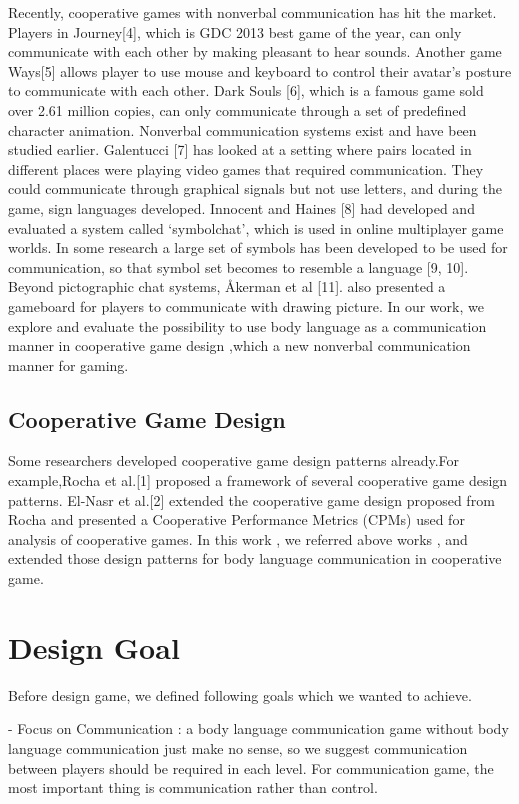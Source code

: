 \documentclass{sigchi}
\begin{document}
Recently, cooperative games with nonverbal communication has hit the market. Players in Journey[4], which is GDC 2013 best game of the year, can only communicate with each other by making pleasant to hear sounds. Another game Ways[5] allows player to use mouse and keyboard to control their avatar’s posture to communicate with each other. Dark Souls [6], which is a famous game sold over 2.61 million copies, can only communicate through a set of predefined character animation.
Nonverbal communication systems exist and have been studied earlier. Galentucci [7] has looked at a setting where pairs located in different places were playing video games that required communication. They could communicate through graphical signals but not use letters, and during the game, sign languages developed. Innocent and Haines [8] had developed and evaluated a system called ‘symbolchat’, which is used in online multiplayer game worlds. In some research a large set of symbols has been developed to be used for communication, so that symbol set becomes to resemble a language [9, 10]. Beyond pictographic chat systems, Åkerman et al [11]. also presented a gameboard for players to communicate with drawing picture.
In our work, we explore and evaluate the possibility to use body language as a communication manner in cooperative game design ,which a new nonverbal communication manner for gaming.

\subsection{Cooperative Game Design}
Some researchers developed cooperative game design patterns already.For example,Rocha et al.[1] proposed a framework of several cooperative game design patterns. El-Nasr et al.[2] extended the cooperative game design proposed from Rocha and presented a Cooperative Performance Metrics (CPMs)  used for analysis of cooperative games. 
In this work , we referred above works , and extended those design patterns for body language communication in cooperative game.

\section{Design Goal}
Before design game, we defined following goals which we wanted to achieve.

- Focus on Communication : a body language communication game without body language communication just make no sense, so we suggest communication between players should be required in each level. For communication game, the most important thing is communication rather than control.
\end{document}
